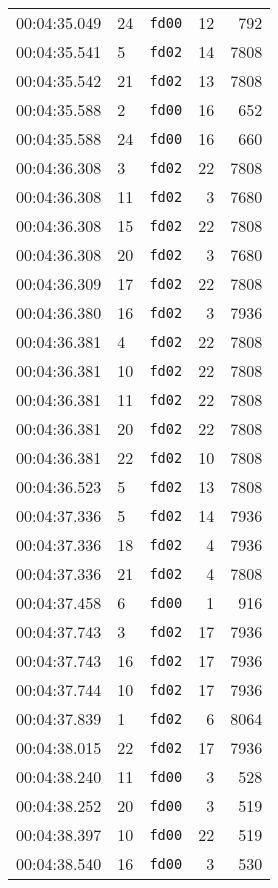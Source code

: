 \documentclass{article}
\begin{document}
\begin{longtable}{lllrr}
00:04:35.049 & 24 & \texttt{fd00} & 12 & 792 \\
00:04:35.541 & 5 & \texttt{fd02} & 14 & 7808 \\
00:04:35.542 & 21 & \texttt{fd02} & 13 & 7808 \\
00:04:35.588 & 2 & \texttt{fd00} & 16 & 652 \\
00:04:35.588 & 24 & \texttt{fd00} & 16 & 660 \\
00:04:36.308 & 3 & \texttt{fd02} & 22 & 7808 \\
00:04:36.308 & 11 & \texttt{fd02} & 3 & 7680 \\
00:04:36.308 & 15 & \texttt{fd02} & 22 & 7808 \\
00:04:36.308 & 20 & \texttt{fd02} & 3 & 7680 \\
00:04:36.309 & 17 & \texttt{fd02} & 22 & 7808 \\
00:04:36.380 & 16 & \texttt{fd02} & 3 & 7936 \\
00:04:36.381 & 4 & \texttt{fd02} & 22 & 7808 \\
00:04:36.381 & 10 & \texttt{fd02} & 22 & 7808 \\
00:04:36.381 & 11 & \texttt{fd02} & 22 & 7808 \\
00:04:36.381 & 20 & \texttt{fd02} & 22 & 7808 \\
00:04:36.381 & 22 & \texttt{fd02} & 10 & 7808 \\
00:04:36.523 & 5 & \texttt{fd02} & 13 & 7808 \\
00:04:37.336 & 5 & \texttt{fd02} & 14 & 7936 \\
00:04:37.336 & 18 & \texttt{fd02} & 4 & 7936 \\
00:04:37.336 & 21 & \texttt{fd02} & 4 & 7808 \\
00:04:37.458 & 6 & \texttt{fd00} & 1 & 916 \\
00:04:37.743 & 3 & \texttt{fd02} & 17 & 7936 \\
00:04:37.743 & 16 & \texttt{fd02} & 17 & 7936 \\
00:04:37.744 & 10 & \texttt{fd02} & 17 & 7936 \\
00:04:37.839 & 1 & \texttt{fd02} & 6 & 8064 \\
00:04:38.015 & 22 & \texttt{fd02} & 17 & 7936 \\
00:04:38.240 & 11 & \texttt{fd00} & 3 & 528 \\
00:04:38.252 & 20 & \texttt{fd00} & 3 & 519 \\
00:04:38.397 & 10 & \texttt{fd00} & 22 & 519 \\
00:04:38.540 & 16 & \texttt{fd00} & 3 & 530 \\

\end{longtable}
\end{document}
